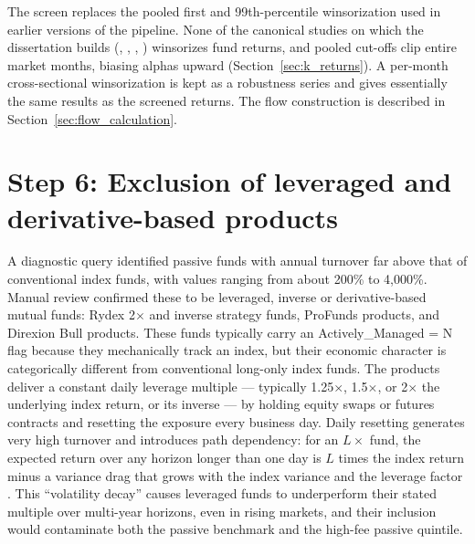 \documentclass[12pt, oneside]{report}
\begin{document}
The screen replaces the pooled first and 99th-percentile winsorization used in
earlier versions of the pipeline. None of the canonical studies on which
the dissertation builds (\textcite{Carhart1997},
\textcite{KosowskiTimmermannWermersWhite2006}, \textcite{FamaFrench2010},
\textcite{BarrasScailletWermers2010}) winsorizes fund returns, and pooled
cut-offs clip entire market months, biasing alphas upward
(Section~\ref{sec:k_returns}). A per-month cross-sectional winsorization
is kept as a robustness series and gives essentially the same results as
the screened returns. The flow construction is described in
Section~\ref{sec:flow_calculation}.

\section{Step 6: Exclusion of leveraged and derivative-based products}
\label{sec:leveraged_exclusion}

\noindent A diagnostic query identified passive funds with annual
turnover far above that of conventional index funds, with values ranging
from about 200\% to 4{,}000\%. Manual review confirmed these to be
leveraged, inverse or derivative-based mutual funds: Rydex 2$\times$ and
inverse strategy funds, ProFunds products, and Direxion Bull products.
These funds typically carry an Actively\_Managed = N flag because they
mechanically track an index, but their economic character is
categorically different from conventional long-only index funds. The
products deliver a constant daily leverage multiple --- typically
1.25$\times$, 1.5$\times$, or 2$\times$ the underlying index return, or
its inverse --- by holding equity swaps or futures contracts and resetting
the exposure every business day. Daily resetting generates very high
turnover and introduces path dependency: for an $L\times$ fund, the
expected return over any horizon longer than one day is $L$ times the
index return minus a variance drag that grows with the index variance
and the leverage factor \parencite{AvellanedaZhang2010}. This
``volatility decay'' causes leveraged funds to underperform their stated
multiple over multi-year horizons, even in rising markets, and their
inclusion would contaminate both the passive benchmark and the
high-fee passive quintile.
\end{document}

